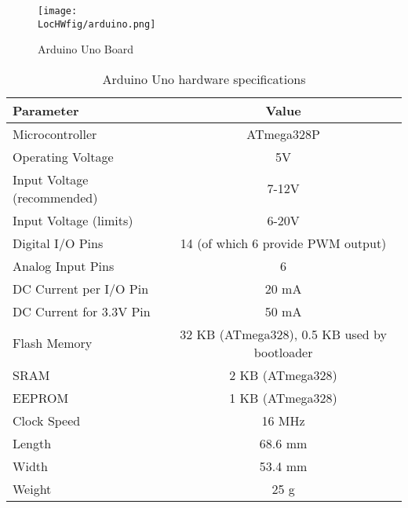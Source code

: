 \begin{figure}
  \centering
  \texttt{[image: \\LocHWfig/arduino.png]}
  \caption{Arduino Uno Board}
  \label{arduino}
\end{figure}

\begin{table}
  \begin{center}
    \begin{tabular}{lc}
      \hline
      Parameter                   & Value                                        \\ \hline
      Microcontroller             & ATmega328P                                   \\
      Operating Voltage           & 5V                                           \\
      Input Voltage (recommended) & 7-12V                                        \\
      Input Voltage (limits)      & 6-20V                                        \\
      Digital I/O Pins            & 14 (of which 6 provide PWM output)           \\
      Analog Input Pins           & 6                                            \\
      DC Current per I/O Pin      & 20 mA                                        \\
      DC Current for 3.3V Pin     & 50 mA                                        \\
      Flash Memory                & 32 KB (ATmega328), 0.5 KB used by bootloader \\
      SRAM                        & 2 KB (ATmega328)                             \\
      EEPROM                      & 1 KB (ATmega328)                             \\
      Clock Speed                 & 16 MHz                                       \\
      Length                      & 68.6 mm                                      \\
      Width                       & 53.4 mm                                      \\
      Weight                      & 25 g                                         \\
      \hline
    \end{tabular}
    \caption{Arduino Uno hardware specifications}
    \label{micro-table}
  \end{center}
\end{table}

